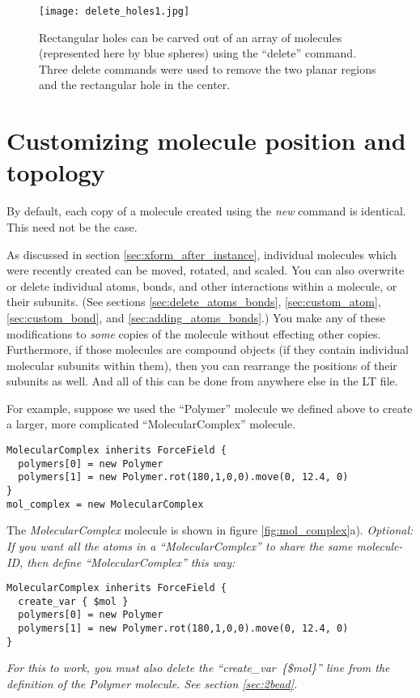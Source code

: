 \documentclass[11pt]{article}
\begin{document}
\begin{figure}[htbp]
\centering
\texttt{[image: delete\_holes1.jpg]}
\caption{
\label{fig:delete_holes}
Rectangular holes can be carved out of an array of molecules
(represented here by blue spheres)
using the ``delete'' command.  Three delete commands were used to
remove the two planar regions and the rectangular hole in the center.
}
\end{figure}






\section{Customizing molecule position and topology}
\label{sec:custom_xform}
By default, each copy of a molecule created using the \textit{new}
command is identical.  This need not be the case.

As discussed in section \ref{sec:xform_after_instance},
individual molecules which were recently created
can be moved, rotated, and scaled.
You can also overwrite or delete individual atoms, 
bonds, and other interactions within a molecule, or their subunits.
(See sections 
\ref{sec:delete_atoms_bonds}, 
\ref{sec:custom_atom},
\ref{sec:custom_bond},
and \ref{sec:adding_atoms_bonds}.)
You make any of these modifications to \textit{some} copies 
of the molecule without effecting other copies.
Furthermore, if those molecules are compound objects 
(if they contain individual molecular subunits within them),
then you can rearrange the positions of their subunits as well.
And all of this can be done from anywhere else in the LT file.

For example, suppose we used the ``Polymer'' molecule we defined above
to create a larger, more complicated ``MolecularComplex'' molecule.
\begin{verbatim}
MolecularComplex inherits ForceField {
  polymers[0] = new Polymer
  polymers[1] = new Polymer.rot(180,1,0,0).move(0, 12.4, 0)
}
mol_complex = new MolecularComplex
\end{verbatim}
The \textit{MolecularComplex} molecule is shown in figure \ref{fig:mol_complex}a). 
\textit{Optional: If you want all the atoms in a ``MolecularComplex'' to share the same molecule-ID,
then define ``MolecularComplex'' this way:}
\begin{verbatim}
MolecularComplex inherits ForceField {
  create_var { $mol }
  polymers[0] = new Polymer
  polymers[1] = new Polymer.rot(180,1,0,0).move(0, 12.4, 0)
}
\end{verbatim}
\textit{For this to work, you must also delete the 
 \mbox{\textit{``create\_var \{\$mol\}''}} line from
 the definition of the Polymer molecule. See section \ref{sec:2bead}.}
\end{document}
